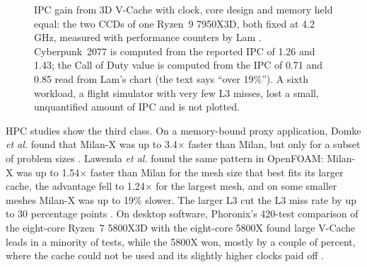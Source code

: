 \begin{figure}[htbp]
\centering
{}
\caption[IPC gain from 3D V-Cache with clock, core design and memory held equal]{IPC gain from 3D V-Cache with clock, core design and memory held equal: the two CCDs of one Ryzen~9 7950X3D, both fixed at 4.2\,GHz, measured with performance counters by Lam \cite{lamAMDs7950X3DZen2023}. Cyberpunk~2077 is computed from the reported IPC of 1.26 and 1.43; the Call of Duty value is computed from the IPC of 0.71 and 0.85 read from Lam's chart (the text says ``over 19\%''). A sixth workload, a flight simulator with very few L3 misses, lost a small, unquantified amount of IPC and is not plotted.}
\label{fig:lam-ipc}
\end{figure}

HPC studies show the third class. On a memory-bound proxy application, Domke \emph{et al.} found that Milan-X was up to 3.4$\times$ faster than Milan, but only for a subset of problem sizes \cite{domkeLocusPerformanceQuantifying2023}. Lawenda \emph{et al.} found the same pattern in OpenFOAM: Milan-X was up to 1.54$\times$ faster than Milan for the mesh size that best fits its larger cache, the advantage fell to 1.24$\times$ for the largest mesh, and on some smaller meshes Milan-X was up to 19\% slower. The larger L3 cut the L3 miss rate by up to 30 percentage points \cite{lawendaEvaluatingImpactL32025}. On desktop software, Phoronix's 420-test comparison of the eight-core Ryzen~7 5800X3D with the eight-core 5800X found large V-Cache leads in a minority of tests, while the 5800X won, mostly by a couple of percent, where the cache could not be used and its slightly higher clocks paid off \cite{larabelAMDRyzen72022}.

